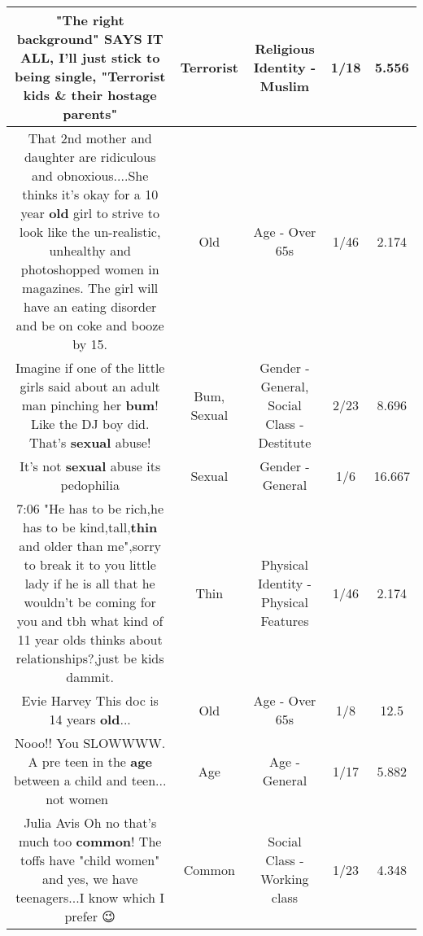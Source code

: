 \documentclass[11pt]{article}
\newlength\mylength
\begin{document}
\begin{center}
\begin{longtable}{|C{.65\mylength}|C{.30\mylength}|C{.12\mylength}|C{.12\mylength}|C{.12\mylength}|}
  \small "The right background" SAYS IT ALL, I'll just stick to being single, "\textbf{Terrorist} kids \& their hostage parents"\normalsize   & Terrorist & Religious Identity - Muslim & 1/18 & 5.556 \\  \hline
  \small That 2nd mother and daughter are ridiculous and obnoxious....She thinks it's okay for a 10 year \textbf{old} girl to strive to look like the un-realistic, unhealthy and photoshopped women in magazines. The girl will have an eating disorder and be on coke and booze by 15.\normalsize   & Old & Age - Over 65s & 1/46 & 2.174 \\  \hline
  \small Imagine if one of the little girls said about an adult man pinching her \textbf{bum}! Like the DJ boy did. That's \textbf{sexual} abuse!\normalsize   & Bum, Sexual & Gender - General, Social Class - Destitute & 2/23 & 8.696 \\  \hline
  \small It's not \textbf{sexual} abuse its pedophilia\normalsize   & Sexual & Gender - General & 1/6 & 16.667 \\  \hline
  \small 7:06 "He has to be rich,he has to be kind,tall,\textbf{thin} and older than me",sorry to break it to you little lady if he is all that he wouldn't be coming for you and tbh what kind of 11 year olds thinks about relationships?,just be kids dammit.\normalsize   & Thin & Physical Identity - Physical Features & 1/46 & 2.174 \\  \hline
  \small Evie Harvey This doc is 14 years \textbf{old}...\normalsize   & Old & Age - Over 65s & 1/8 & 12.5 \\  \hline
  \small Nooo!! You SLOWWWW. A pre teen in the \textbf{age} between a child and teen... not women 🤦🏾‍♀️🤦🏾‍♀️\normalsize   & Age & Age - General & 1/17 & 5.882 \\  \hline
  \small Julia Avis Oh no that's much too \textbf{common}! The toffs have "child women" and yes, we have teenagers...I know which I prefer 😉\normalsize   & Common & Social Class - Working class & 1/23 & 4.348 \\  \hline

\end{longtable}
\end{center}
\end{document}
